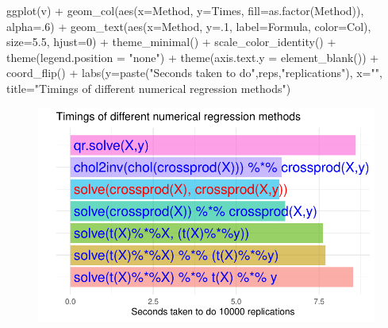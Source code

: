 \documentclass[
  letterpaper,
]{book}
\newenvironment{Shaded}{\begin{snugshade}}{\end{snugshade}}
\newcommand{\AttributeTok}[1]{\textcolor[rgb]{0.40,0.45,0.13}{#1}}
\newcommand{\DecValTok}[1]{\textcolor[rgb]{0.68,0.00,0.00}{#1}}
\newcommand{\FloatTok}[1]{\textcolor[rgb]{0.68,0.00,0.00}{#1}}
\newcommand{\FunctionTok}[1]{\textcolor[rgb]{0.28,0.35,0.67}{#1}}
\newcommand{\NormalTok}[1]{\textcolor[rgb]{0.00,0.23,0.31}{#1}}
\newcommand{\SpecialCharTok}[1]{\textcolor[rgb]{0.37,0.37,0.37}{#1}}
\newcommand{\StringTok}[1]{\textcolor[rgb]{0.13,0.47,0.30}{#1}}
\begin{document}
\begin{Shaded}
\begin{Highlighting}[]
\FunctionTok{ggplot}\NormalTok{(v) }\SpecialCharTok{+} 
  \FunctionTok{geom\_col}\NormalTok{(}\FunctionTok{aes}\NormalTok{(}\AttributeTok{x=}\NormalTok{Method, }\AttributeTok{y=}\NormalTok{Times, }\AttributeTok{fill=}\FunctionTok{as.factor}\NormalTok{(Method)), }\AttributeTok{alpha=}\NormalTok{.}\DecValTok{6}\NormalTok{) }\SpecialCharTok{+} 
  \FunctionTok{geom\_text}\NormalTok{(}\FunctionTok{aes}\NormalTok{(}\AttributeTok{x=}\NormalTok{Method, }\AttributeTok{y=}\NormalTok{.}\DecValTok{1}\NormalTok{, }\AttributeTok{label=}\NormalTok{Formula, }\AttributeTok{color=}\NormalTok{Col), }\AttributeTok{size=}\FloatTok{5.5}\NormalTok{, }\AttributeTok{hjust=}\DecValTok{0}\NormalTok{) }\SpecialCharTok{+}
  \FunctionTok{theme\_minimal}\NormalTok{() }\SpecialCharTok{+} 
  \FunctionTok{scale\_color\_identity}\NormalTok{() }\SpecialCharTok{+} 
  \FunctionTok{theme}\NormalTok{(}\AttributeTok{legend.position =} \StringTok{"none"}\NormalTok{) }\SpecialCharTok{+} 
  \FunctionTok{theme}\NormalTok{(}\AttributeTok{axis.text.y =} \FunctionTok{element\_blank}\NormalTok{()) }\SpecialCharTok{+} 
  \FunctionTok{coord\_flip}\NormalTok{() }\SpecialCharTok{+} 
  \FunctionTok{labs}\NormalTok{(}\AttributeTok{y=}\FunctionTok{paste}\NormalTok{(}\StringTok{"Seconds taken to do"}\NormalTok{,reps,}\StringTok{"replications"}\NormalTok{), }\AttributeTok{x=}\StringTok{""}\NormalTok{, }
       \AttributeTok{title=}\StringTok{"Timings of different numerical regression methods"}\NormalTok{)}
\end{Highlighting}
\end{Shaded}

\begin{figure}[H]

{\centering \includegraphics{LinAlg_files/figure-pdf/unnamed-chunk-17-1.pdf}

}

\end{figure}


\backmatter

\printindex
\end{document}
